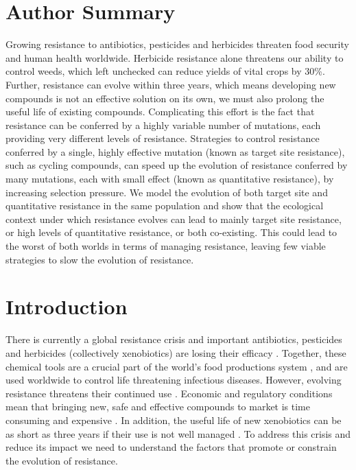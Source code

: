 \documentclass[10pt,letterpaper]{article}
\begin{document}
\section*{Author Summary}
Growing resistance to antibiotics, pesticides and herbicides threaten food security and human health worldwide. Herbicide resistance alone threatens our ability to control weeds, which left unchecked can reduce yields of vital crops by 30\%. Further, resistance can evolve within three years, which means developing new compounds is not an effective solution on its own, we must also prolong the useful life of existing compounds. Complicating this effort is the fact that resistance can be conferred by a highly variable number of mutations, each providing very different levels of resistance. Strategies to control resistance conferred by a single, highly effective mutation (known as target site resistance), such as cycling compounds, can speed up the evolution of resistance conferred by many mutations, each with small effect (known as quantitative resistance), by increasing selection pressure. We model the evolution of both target site and quantitative resistance in the same population and show that the ecological context under which resistance evolves can lead to mainly target site resistance, or high levels of quantitative resistance, or both co-existing. This could lead to the worst of both worlds in terms of managing resistance, leaving few viable strategies to slow the evolution of resistance.      

\linenumbers

\section*{Introduction}
There is currently a global resistance crisis \cite{Serv2013, Ross2014} and important antibiotics, pesticides and herbicides (collectively xenobiotics) are losing their efficacy \cite{Palu2001}. Together, these chemical tools are a crucial part of the world's food productions system \cite{Duke2012}, and are used worldwide to control life threatening infectious diseases. However, evolving resistance threatens their continued use \cite{Barb2011, Nkya2013}. Economic and regulatory conditions mean that bringing new, safe and effective compounds to market is time consuming and expensive \cite{Duke2012}. In addition, the useful life of new xenobiotics can be as short as three years if their use is not well managed \cite{Palu2001, Duke2012}. To address this crisis and reduce its impact we need to understand the factors that promote or constrain the evolution of resistance. 
\end{document}
